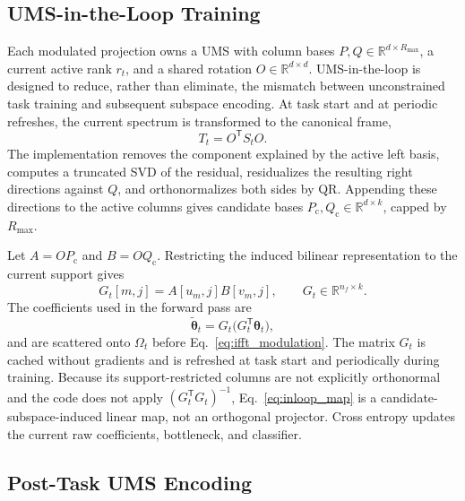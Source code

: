 \subsection{UMS-in-the-Loop Training}
\label{sec:inloop}

Each modulated projection owns a UMS with column bases
$P,Q\in\mathbb{R}^{d\times R_{\max}}$, a current active rank $r_t$, and a
shared rotation $O\in\mathbb{R}^{d\times d}$.  UMS-in-the-loop is designed to
reduce, rather than eliminate, the mismatch between unconstrained task training
and subsequent subspace encoding.  At task start and at periodic refreshes, the
current spectrum is transformed to the canonical frame,
\begin{equation}
 T_t=O^{\mathsf T}S_tO.
 \label{eq:canonical}
\end{equation}
The implementation removes the component explained by the active left basis,
computes a truncated SVD of the residual, residualizes the resulting right
directions against $Q$, and orthonormalizes both sides by QR.  Appending these
directions to the active columns gives candidate bases
$P_{\mathrm{c}},Q_{\mathrm{c}}\in\mathbb{R}^{d\times k}$, capped by
$R_{\max}$.

Let $A=OP_{\mathrm{c}}$ and $B=OQ_{\mathrm{c}}$.  Restricting the induced
bilinear representation to the current support gives
\begin{equation}
 G_t[m,j]=A[u_m,j]B[v_m,j],
 \qquad G_t\in\mathbb{R}^{n_f\times k}.
 \label{eq:G}
\end{equation}
The coefficients used in the forward pass are
\begin{equation}
 \widetilde{\boldsymbol{\theta}}_t
 =G_t\bigl(G_t^{\mathsf T}\boldsymbol{\theta}_t\bigr),
 \label{eq:inloop_map}
\end{equation}
and are scattered onto $\Omega_t$ before Eq.~\eqref{eq:ifft_modulation}.  The
matrix $G_t$ is cached without gradients and is refreshed at task start and
periodically during training.  Because its support-restricted columns are not
explicitly orthonormal and the code does not apply
$(G_t^{\mathsf T}G_t)^{-1}$, Eq.~\eqref{eq:inloop_map} is a
candidate-subspace-induced linear map, not an orthogonal projector.  Cross
entropy updates the current raw coefficients, bottleneck, and classifier.

\subsection{Post-Task UMS Encoding}
\label{sec:encoding}

